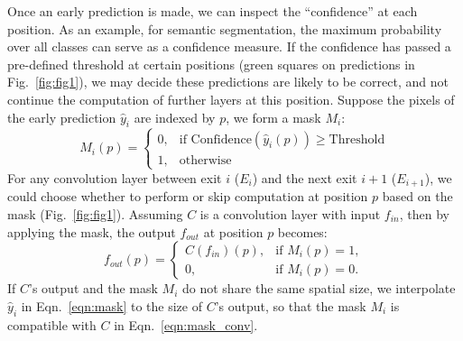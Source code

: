 Once an early prediction is made, we can inspect the ``confidence'' at each position.
As an example, for semantic segmentation, the maximum probability over all classes can serve as a confidence measure.
If the confidence has passed a pre-defined threshold at certain positions (green squares on predictions in Fig.~\ref{fig:fig1}), we may decide these predictions are likely to be correct, and not continue the computation of further layers at this position.
Suppose the pixels of the early prediction $\hat{y}_i$ are indexed by $p$, we form a mask $M_i$:
\begin{equation}
\label{eqn:mask}
M_i(p) = 
\begin{cases}
    0, & \text{if Confidence}(\hat{y}_i (p)) \geq \text{Threshold} \\
    1,              & \text{otherwise}
\end{cases}
\end{equation}
For any convolution layer between exit $i$ ($E_i$) and the next exit $i+1$ ($E_{i+1}$), we could choose whether to perform or skip computation at position $p$ based on the mask (Fig.~\ref{fig:fig1}).
Assuming $C$ is a convolution layer with input $f_{in}$, then by applying the mask, the output $f_{out}$ at position $p$ becomes:
\begin{equation}
\label{eqn:mask_conv}
f_{out}(p)  = 
\begin{cases}
    C(f_{in})(p), & \text{if } M_i(p) = 1, \\
    0,  & \text{if } M_i(p) = 0.
\end{cases}
\end{equation}
If $C$'s output and the mask $M_i$ do not share the same spatial size, we interpolate $\hat{y}_i$ in Eqn.~\ref{eqn:mask} to the size of $C$'s output, so that the mask $M_i$ is compatible with $C$ in Eqn.~\ref{eqn:mask_conv}.

